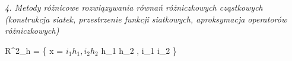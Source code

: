\textit{4. Metody różnicowe rozwiązywania równań różniczkowych cząstkowych (konstrukcja siatek, przestrzenie funkcji siatkowych, aproksymacja operatorów różniczkowych)}


R^{2}_{h} = \{ x = \(i_{1}h_{1}, i_{2}h_{2}\) h_{1} h_{2} , i_{1} i_{2} \in {}\}